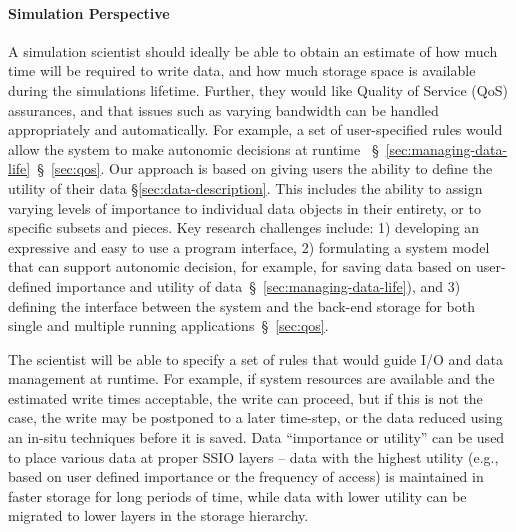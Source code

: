 \paragraph{Simulation Perspective}
\label{subsec:sim-perspective}
A simulation scientist should ideally be able to
obtain an estimate of how much time will be required to write data,
and how much storage space is available during the simulations lifetime.
Further, they would like Quality of Service (QoS) assurances, and that
issues such as varying bandwidth can be handled appropriately and 
automatically. For example, a set of user-specified rules would allow 
the system to make autonomic decisions at runtime
~\S~\ref{sec:managing-data-life}~\S~\ref{sec:qos}.
%
Our approach is based on giving users the ability to define the utility of
their data \S\ref{sec:data-description}. This includes the ability to assign
varying levels of importance to individual data objects in their entirety,
or to specific subsets and pieces. Key research challenges include: 1)
developing an expressive and easy to use a program interface, 2) formulating
a system model that can support autonomic decision, for example, for saving
data based on user-defined importance and utility of
data~\S~\ref{sec:managing-data-life}), and 3) defining the interface between
the system and the back-end storage for both single and multiple running
applications~\S~\ref{sec:qos}.

The scientist will be able to specify a set of rules that
would guide I/O and data management at runtime. For example, if system
resources are available and the estimated write times acceptable, the write
can proceed, but if this is not the case, the write may be postponed to a
later time-step, or the data reduced using an in-situ techniques before it
is saved. Data ``importance or utility'' can be used to place various data
at proper SSIO layers -- data with the highest utility (e.g., based on user
defined importance or the frequency of access) is maintained in faster
storage for long periods of time, while data with lower utility can be
migrated to lower layers in the storage hierarchy.

%

